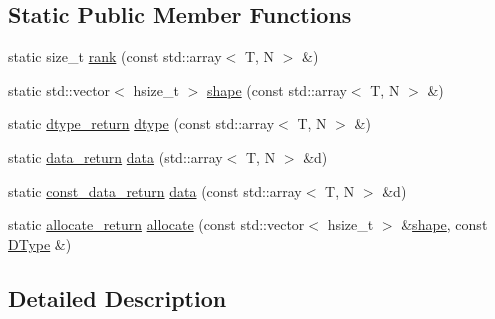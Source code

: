 \subsection*{Static Public Member Functions}
\begin{DoxyCompactItemize}
\item 
static size\-\_\-t \hyperlink{struct_h5_t_l_1_1adapt_3_01std_1_1array_3_01_t_00_01_n_01_4_00_01void_01_4_a5045a39131ec5c0f9fd9aa45141892d3}{rank} (const std\-::array$<$ T, N $>$ \&)
\item 
static std\-::vector$<$ hsize\-\_\-t $>$ \hyperlink{struct_h5_t_l_1_1adapt_3_01std_1_1array_3_01_t_00_01_n_01_4_00_01void_01_4_afe7c303fd455b4a30256f8d5897d6f10}{shape} (const std\-::array$<$ T, N $>$ \&)
\item 
static \hyperlink{struct_h5_t_l_1_1adapt_3_01std_1_1array_3_01_t_00_01_n_01_4_00_01void_01_4_a1fb1cc7652f556911559cf0f5ceebb9e}{dtype\-\_\-return} \hyperlink{struct_h5_t_l_1_1adapt_3_01std_1_1array_3_01_t_00_01_n_01_4_00_01void_01_4_ad4715230ba59c8216c547d07b2d3ac20}{dtype} (const std\-::array$<$ T, N $>$ \&)
\item 
static \hyperlink{struct_h5_t_l_1_1adapt_3_01std_1_1array_3_01_t_00_01_n_01_4_00_01void_01_4_accd8b93ace8a6bbdb0bdd3ae379aa4b3}{data\-\_\-return} \hyperlink{struct_h5_t_l_1_1adapt_3_01std_1_1array_3_01_t_00_01_n_01_4_00_01void_01_4_a0995e2129645afb1cf3ac5a1b055b031}{data} (std\-::array$<$ T, N $>$ \&d)
\item 
static \hyperlink{struct_h5_t_l_1_1adapt_3_01std_1_1array_3_01_t_00_01_n_01_4_00_01void_01_4_a544cf89eec2ebdad714c22f0e4c31f7c}{const\-\_\-data\-\_\-return} \hyperlink{struct_h5_t_l_1_1adapt_3_01std_1_1array_3_01_t_00_01_n_01_4_00_01void_01_4_af2c4f746cc17e16885d44cae662f14ec}{data} (const std\-::array$<$ T, N $>$ \&d)
\item 
static \hyperlink{struct_h5_t_l_1_1adapt_3_01std_1_1array_3_01_t_00_01_n_01_4_00_01void_01_4_a503a3ed58eb6cd304c2a55b54b212b25}{allocate\-\_\-return} \hyperlink{struct_h5_t_l_1_1adapt_3_01std_1_1array_3_01_t_00_01_n_01_4_00_01void_01_4_a8bb0543d19a6316a610bb7ac62e430a1}{allocate} (const std\-::vector$<$ hsize\-\_\-t $>$ \&\hyperlink{struct_h5_t_l_1_1adapt_3_01std_1_1array_3_01_t_00_01_n_01_4_00_01void_01_4_afe7c303fd455b4a30256f8d5897d6f10}{shape}, const \hyperlink{class_h5_t_l_1_1_d_type}{D\-Type} \&)
\end{DoxyCompactItemize}


\subsection{Detailed Description}
